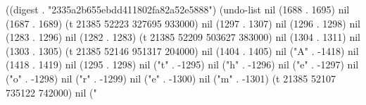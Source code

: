 
((digest . "2335a2b655ebdd411802fa82a52e5888") (undo-list nil (1688 . 1695) nil (1687 . 1689) (t 21385 52223 327695 933000) nil (1297 . 1307) nil (1296 . 1298) nil (1283 . 1296) nil (1282 . 1283) (t 21385 52209 503627 383000) nil (1304 . 1311) nil (1303 . 1305) (t 21385 52146 951317 204000) nil (1404 . 1405) nil ("A" . -1418) nil (1418 . 1419) nil (1295 . 1298) nil ("t" . -1295) nil ("h" . -1296) nil ("e" . -1297) nil ("o" . -1298) nil ("r" . -1299) nil ("e" . -1300) nil ("m" . -1301) (t 21385 52107 735122 742000) nil ("%
